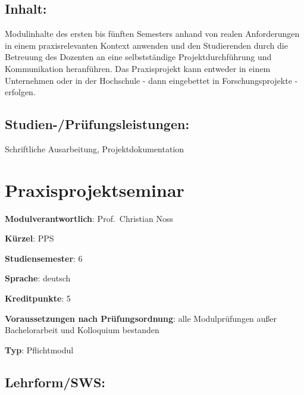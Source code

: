 \section*{Inhalt:}\label{inhalt-18}

Modulinhalte des ersten bis fünften Semesters anhand von realen
Anforderungen in einem praxisrelevanten Kontext anwenden und den
Studierenden durch die Betreuung des Dozenten an eine selbstständige
Projektdurchführung und Kommunikation heranführen. Das Praxisprojekt
kann entweder in einem Unternehmen oder in der Hochschule - dann
eingebettet in Forschungsprojekte - erfolgen.

\section*{Studien-/Prüfungsleistungen:}\label{studien-pruxfcfungsleistungen-16}

Schriftliche Ausarbeitung, Projektdokumentation

\chapter{Praxisprojektseminar}\label{praxisprojektseminar}

\begin{modulHead}
\textbf{Modulverantwortlich}: Prof.~Christian
Noss
\end{modulHead}
\begin{modulHead}
\textbf{Kürzel}:
PPS
\end{modulHead}
\begin{modulHead}
\textbf{Studiensemester}:
6
\end{modulHead}
\begin{modulHead}
\textbf{Sprache}:
deutsch
\end{modulHead}
\begin{modulHead}
\textbf{Kreditpunkte}:
5
\end{modulHead}
\begin{modulHead}
\textbf{Voraussetzungen nach
Prüfungsordnung}: alle Modulprüfungen außer Bachelorarbeit und
Kolloquium bestanden
\end{modulHead}
\begin{modulHead}
\textbf{Typ}:
Pflichtmodul
\end{modulHead}


\section*{Lehrform/SWS:}\label{lehrformsws-19}

